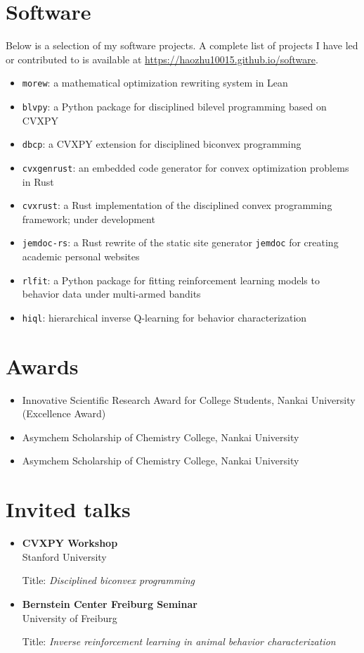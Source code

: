 \documentclass{article}
\newenvironment{cvblock}{%
    \begin{itemize}[
      leftmargin=1in,%
      labelsep=0.3in,%
      font=\itshape,%
      label={}%
    ]
}{%
    \end{itemize}
}
\begin{document}
\section{Software}
Below is a selection of my software projects.
A complete list of projects I have led or contributed to is available at \url{https://haozhu10015.github.io/software}.
\begin{itemize}
    \item \texttt{morew}: a mathematical optimization rewriting system in Lean
    \item \texttt{blvpy}: a Python package for disciplined bilevel programming based on CVXPY
    \item \texttt{dbcp}: a CVXPY extension for disciplined biconvex programming
    \item \texttt{cvxgenrust}: an embedded code generator for convex optimization problems in Rust 
    \item \texttt{cvxrust}: a Rust implementation of the disciplined convex programming framework; under development
    \item \texttt{jemdoc-rs}: a Rust rewrite of the static site generator \texttt{jemdoc} for creating academic personal websites
    \item \texttt{rlfit}: a Python package for fitting reinforcement learning models to behavior data under multi-armed bandits
    \item \texttt{hiql}: hierarchical inverse Q-learning for behavior characterization
\end{itemize}

\section{Awards}
\begin{cvblock}
    \item[2020] Innovative Scientific Research Award for College Students, Nankai University (Excellence Award)
    \item[2018] Asymchem Scholarship of Chemistry College, Nankai University
    \item[2017] Asymchem Scholarship of Chemistry College, Nankai University
\end{cvblock}

\section{Invited talks}
\begin{cvblock}
    \item[2026] \textbf{CVXPY Workshop}\\
        Stanford University\par
        Title: \emph{Disciplined biconvex programming}
    \item[2024] \textbf{Bernstein Center Freiburg Seminar}\\
        University of Freiburg\par
        Title: \emph{Inverse reinforcement learning in animal behavior characterization}
\end{cvblock}
\end{document}
